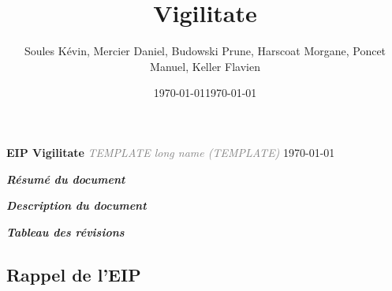 \documentclass[a4paper,12pt]{report}
\title{\doctitle{} Vigilitate}
\author{Soules Kévin, Mercier Daniel, Budowski Prune, Harscoat Morgane, Poncet Manuel, Keller Flavien}
\date{\today}
\newcommand{\doctitle}{TEMPLATE}
\newcommand{\doclongtitle}{TEMPLATE long name}
\begin{document}
\date{\slashdate\today}
\setcounter{page}{-10}


\thispagestyle{empty}
\begin{center}
  \textcolor{myBlue}{\Huge \textbf{EIP Vigilitate}}\linebreak
  \textcolor{gray}{\textit{\Large \doclongtitle{} (\doctitle{})}}\linebreak
  {\today}
\end{center}
\newpage


\begin{flushleft}
  \textcolor{myBlue}{\textit{\large \textbf{Résumé du document}}}\linebreak
\end{flushleft}

\newpage


\begin{flushleft}
  \textcolor{myBlue}{\textit{\large \textbf{Description du document}}} 
  \bigbreak
  
  \bigbreak
  \bigbreak
  \textcolor{myBlue}{\textit{\large \textbf{Tableau des révisions}}}
  \bigbreak
  
\end{flushleft}


\tableofcontents


\textcolor{myBlue}{\chapter{Rappel de l'EIP}}
\setcounter{page}{1}



\end{document}
